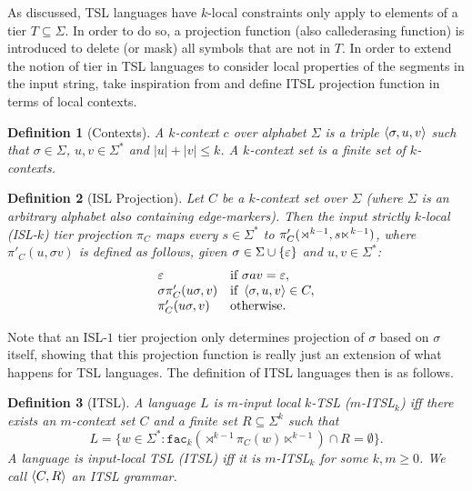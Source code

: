 \documentclass[11pt,a4paper]{article}
\newcommand{\facn}[1]{\ensuremath{\texttt{fac}_{#1}}}
\newtheorem{definition}{Definition}
\begin{document}
As discussed, TSL languages  have $k$-local constraints only apply to elements of a tier $T \subseteq \Sigma$.
In order to do so, a projection function (also callederasing function) is introduced to delete (or mask) all symbols that are not in $T$.
In order to extend the notion of tier in TSL languages to consider local properties of the segments in the input string, \citet{desanto2019structure} take inspiration from \cite{ChandleeHeinz18} and define ITSL projection function in terms of local contexts.
%
\begin{definition}[Contexts]
    A \emph{$k$-context} $c$ over alphabet $\Sigma$ is a triple $\left \langle \sigma, u, v \right \rangle $ such that $\sigma \in \Sigma$, $u, v \in \Sigma^*$ and $|u| + |v| \leq k$.
    A \emph{$k$-context set} is a finite set of $k$-contexts.
\end{definition}
%
\begin{definition}[ISL Projection]
    Let $C$ be a $k$-context set over $\Sigma$ (where $\Sigma$ is an arbitrary alphabet also containing edge-markers).
    Then the \emph{input strictly $k$-local} (ISL-$k$) tier projection $\pi_C$ maps every $s \in \Sigma^*$ to $\pi'_C(\rtimes^{k-1}, s\ltimes^{k-1})$, where $\pi'_C(u, \sigma v)$ is defined as follows, given $\sigma \in \Sigma \cup \left \{ \varepsilon \right \}$ and $u,v \in \Sigma^*$:
    \[
    \begin{array}{ll}
        \varepsilon & \text{if } \sigma a v = \varepsilon,\\
        \sigma \pi'_C(u\sigma, v) & \text{if } \left \langle \sigma, u, v \right \rangle  \in C,\\
        \pi'_C(u\sigma, v) & \text{otherwise.}
    \end{array}
    \]
\end{definition}
Note that an ISL-$1$ tier projection only determines projection of $\sigma$ based on $\sigma$ itself, showing that this projection function is really just an extension of what happens for TSL languages\@.
The definition of ITSL languages then  is as follows\@.

\begin{definition}[ITSL]
A language $L$ is \emph{$m$-input local $k$-TSL} ($m$-ITSL$_k$) iff there exists an $m$-context set $C$ and a finite set $R \subseteq \Sigma^k$ such that
\[
L = \{ w \in \Sigma^*: \facn{k}(\rtimes^{k-1} \pi_C(w) \ltimes^{k-1})  \cap R = \emptyset \}.
\]
A language is \emph{input-local TSL} (ITSL) iff it is $m$-ITSL$_k$ for some $k, m \geq 0$.
We call $\left \langle C, R \right \rangle $ an ITSL grammar.
\label{dfn:ITSL}
\end{definition}
\end{document}
